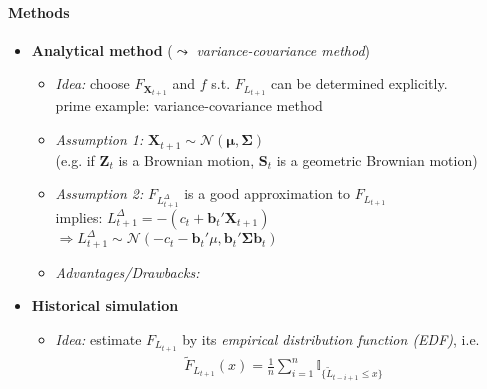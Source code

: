 \documentclass[a4paper,landscape,8pt,fleqn]{scrartcl}
\renewcommand{\emph}[1]{\textbf{#1}}
\begin{document}
\begin{multicols*}{3}
\paragraph{Methods}
\begin{itemize}
\item \emph{Analytical method} ($\leadsto$ \textit{variance-covariance method})
\begin{itemize}
\item \textit{Idea:} choose $F_{\bm X_{t+1}}$ and $f$ s.t. $F_{L_{t+1}}$ can be determined explicitly. \\
prime example: variance-covariance method
\item \textit{Assumption 1:} $\bm X_{t+1} \sim \mathcal{N}(\bm \mu, \bm \Sigma)$ \\
(e.g. if $\bm Z_t$ is a Brownian motion, $\bm S_t$ is a geometric Brownian motion)
\item \textit{Assumption 2:} $F_{L_{t+1}^\Delta}$ is a good approximation to $F_{L_{t+1}}$ \\
implies: $L_{t+1}^\Delta = -(c_t + \bm b_t' \bm X_{t+1})$ \\
$\Rightarrow L_{t+1}^\Delta \sim \mathcal{N}(-c_t - \bm b_t' \mu, \bm b_t' \bm \Sigma \bm b_t)$
\item \textit{Advantages/Drawbacks:}
\end{itemize}
\item \emph{Historical simulation}
\begin{itemize}
\item \textit{Idea:} estimate $F_{L_{t+1}}$ by its \textit{empirical distribution function (EDF)}, i.e.
\begin{align*}
\tilde F_{L_{t+1}}(x) = \frac{1}{n} \sum_{i=1}^n \mathbb{I}_{\lbrace \tilde L_{t-i+1} \leq x \rbrace}
\end{align*}

\end{itemize}
\end{itemize}
\end{multicols*}
\end{document}
